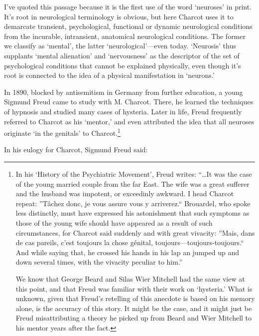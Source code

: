 \begin{refsection}
I've quoted this passage because it is the first use of the word `neuroses' in print. It's root in neurological terminology is obvious, but here Charcot uses it to demarcate transient, psychological, functional or dynamic neurological conditions from the incurable, intransient, anatomical neurological conditions. The former we classify as `mental', the latter `neurological'---even today. `Neurosis' thus supplants `mental alienation' and `nervousness' as the descriptor of the set of psychological conditions that cannot be explained physically, even though it's root is connected to the idea of a physical manifestation in `neurons.'

In 1890, blocked by antisemitism in Germany from further education, a young Sigmund Freud came to study with M. Charcot. There, he learned the techniques of hypnosis and studied many cases of hysteria. Later in life, Freud frequently referred to Charcot as his `mentor,' and even attributed the idea that all neuroses originate `in the genitals' to Charcot.\footnote{In his `History of the Psychiatric Movement', Freud writes: ``{\ldots}It was the case of the young married couple from the far East. The wife was a great sufferer and the husband was impotent, or exceedinly awkward. I head Charcot repeat: ''Tâchez donc, je vous assure vous y arriverez.`` Brouardel, who spoke less distinctly, must have expressed his astonishment that such symptoms as those of the young wife should have appeared as a result of such circumstances, for Charcot said suddenly and with great vivacity: ''Mais, dans de cas pareils, c'est toujours la chose génital, toujours---toujours-toujours.`` And while saying that, he crossed his hands in his lap an jumped up and down several times, with the vivacity peculiar to him.'' ~\citep[p. 937--938]{Freud:1938vi}

We know that George Beard and Silas Wier Mitchell had the same view at this point, and that Freud was familiar with their work on `hysteria.' What is unknown, given that Freud's retelling of this anecdote is based on his memory alone, is the accuracy of this story. It might be the case, and it might just be Freud misattributing a theory he picked up from Beard and Wier Mitchell to his mentor years after the fact.}

In his eulogy for Charcot, Sigmund Freud said:

\begin{quote}


\end{quote}
\end{refsection}
